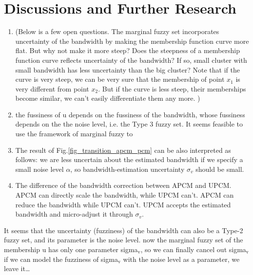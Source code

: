 \documentclass[journal]{IEEEtran}
\theoremstyle{definition}
\begin{document}
\section{Discussions and Further Research}
\label{sec-5}
\begin{enumerate}
\item (Below is a few open questions. The marginal fuzzy set incorporates uncertainty of the bandwidth by making the membership function curve more flat.  But why not make it more steep? Does the steepness of a membership function curve reflects uncertainty of the bandwidth? If so, small cluster with small bandwidth has less uncertainty than the big cluster? Note that if the curve is very steep, we can be very sure that the membership of point $x_1$ is very different from point $x_2$. But if the curve is less steep, their memberships become similar, we can't easily differentiate them any more. )
\item the fussiness of u depends on the fussiness of the bandwidth, whose fussiness depends on the the noise level, i.e. the Type 3 fuzzy set. It seems feasible to use the framework of marginal fuzzy to
\item The result of Fig.\ref{fig_transition_apcm_pcm} can be also interpreted as follows: we are less uncertain about the estimated bandwidth if we specify a small noise level $\alpha$, so bandwidth-estimation uncertainty $\sigma_v$ should be small.
\item The difference of the bandwidth correction between APCM and UPCM. APCM can directly scale the bandwidth, while UPCM can't. APCM can reduce the bandwidth while UPCM can't. UPCM accepts the estimated bandwidth and micro-adjust it through $\sigma_v$.
\end{enumerate}
It seems that the uncertainty (fuzziness) of the bandwidth can also be a Type-2 fuzzy set, and its parameter is the noise level.
 now the marginal fuzzy set of the membership u has only one parameter sigma$_{\text{v}}$, so we can finally cancel out sigma$_{\text{v}}$ if we can model the fuzziness of sigma$_{\text{v}}$ with the noise level as a parameter, we leave it\ldots{}




\end{document}
